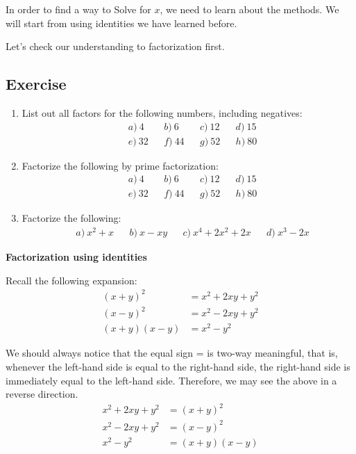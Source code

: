 \documentclass[12pt]{article}
\begin{document}
    In order to find a way to Solve for $x$, we need to learn about the methods. We will start from using identities we have learned before.

    Let's check our understanding to factorization first.
    \subsection*{Exercise}
    \begin{enumerate}
        \item List out all factors for the following numbers, including negatives:\begin{align*}
            &a)\ 4&&b)\ 6&&c)\ 12&&d)\ 15\\
            &e)\ 32&&f)\ 44&&g)\ 52&&h)\ 80
        \end{align*}
        \item Factorize the following by prime factorization:\begin{align*}
            &a)\ 4&&b)\ 6&&c)\ 12&&d)\ 15\\
            &e)\ 32&&f)\ 44&&g)\ 52&&h)\ 80
        \end{align*}
        \item Factorize the following:\begin{align*}
            &a)\ x^2+x&&b)\ x-xy&&c)\ x^4+2x^2+2x&&d)\ x^3-2x
        \end{align*}
    \end{enumerate}

    \begin{center}
        \textbf{Factorization using identities}
    \end{center}

    Recall the following expansion:\begin{align*}
        (x+y)^2&=x^2+2xy+y^2\\
        (x-y)^2&=x^2-2xy+y^2\\
        (x+y)(x-y)&=x^2-y^2
    \end{align*}

    We should always notice that the equal sign = is two-way meaningful, that is, whenever the left-hand side is equal to the right-hand side, the right-hand side is immediately equal to the left-hand side. Therefore, we may see the above in a reverse direction.\begin{align*}
        x^2+2xy+y^2&=(x+y)^2\\
        x^2-2xy+y^2&=(x-y)^2\\
        x^2-y^2&=(x+y)(x-y)
    \end{align*}
\end{document}
